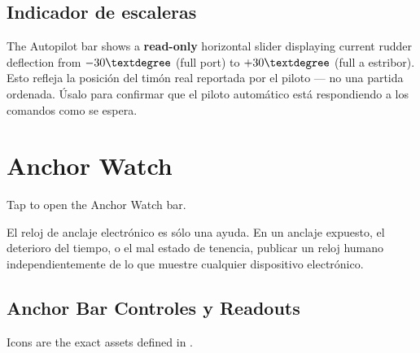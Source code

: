 \section{Indicador de escaleras}

The Autopilot bar shows a \textbf{read-only} horizontal slider displaying current
rudder deflection from $-30\textdegree$ (full port) to $+30\textdegree$ (full
a estribor).
Esto refleja la posición del timón real reportada por el piloto ---
no una partida ordenada.
Úsalo para confirmar que el piloto automático está respondiendo a los comandos como se espera.

\chapter{Anchor Watch}
\label{ch:anchor}

Tap  to open the Anchor Watch bar.

\begin{warningbox}
El reloj de anclaje electrónico es sólo una ayuda.
En un anclaje expuesto, el deterioro del tiempo, o el mal estado de tenencia,
publicar un reloj humano independientemente de lo que muestre cualquier dispositivo electrónico.
\end{warningbox}


\section{Anchor Bar Controles y Readouts}

Icons are the exact assets defined in .

